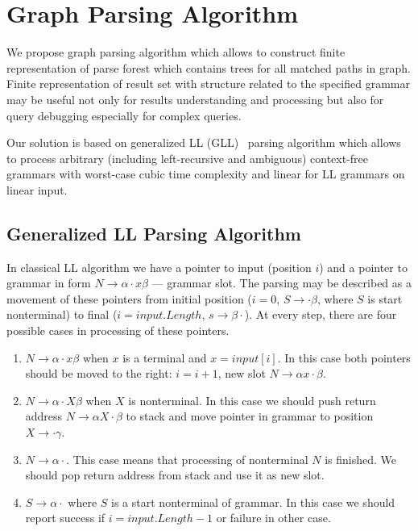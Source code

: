 \section{Graph Parsing Algorithm}

We propose graph parsing algorithm which allows to construct finite representation of parse forest which contains trees for all matched paths in graph.
Finite representation of result set with structure related to the specified grammar may be useful not only for results understanding and processing but also for query debugging especially for complex queries. 

Our solution is based on generalized LL (GLL)~\cite{scott2010gll, FastPracticalGLL} parsing algorithm which allows to process arbitrary (including left-recursive and ambiguous) context-free grammars with worst-case cubic time complexity and linear for LL grammars on linear input. 

\subsection{Generalized LL Parsing Algorithm}

In classical LL algorithm we have a pointer to input (position $i$) and a pointer to grammar in form $N \rightarrow \alpha \cdot x \beta $ --- grammar slot.
The parsing may be described as a movement of these pointers from initial position ($i = 0$, $S \rightarrow \cdot \beta $, where $S$ is start nonterminal) to final ($i = input.Length$, $s \rightarrow \beta \cdot$).
At every step, there are four possible cases in processing of these pointers. 

\begin{enumerate}
\item $N \rightarrow \alpha \cdot x \beta $ when $x$ is a terminal and $x = input[i]$. In this case both pointers should be moved to the right: $i = i + 1$, new slot $N \rightarrow \alpha  x \cdot \beta $.
\item $N \rightarrow \alpha \cdot X \beta $ when $X$ is nonterminal. In this case we should push return address $N \rightarrow \alpha X \cdot \beta $ to stack and move pointer in grammar to position $X \rightarrow \cdot \gamma$.\label{itm:2}
\item $N \rightarrow \alpha \cdot $. This case means that processing of nonterminal $N$ is finished. We should pop return address from stack and use it as new slot.\label{itm:3}
\item $S \rightarrow \alpha \cdot $ where $S$ is a start nonterminal of grammar. In this case we should report success if $i = input.Length - 1$ or failure in other case. 
\end{enumerate}

